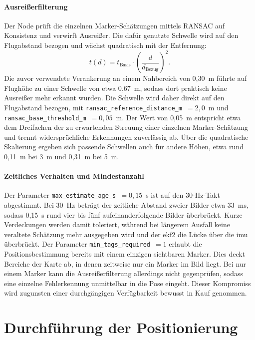 \paragraph{Ausreißerfilterung}
Der Node prüft die einzelnen Marker-Schätzungen mittels RANSAC auf Konsistenz und verwirft Ausreißer.
Die dafür genutzte Schwelle wird auf den Flugabstand bezogen und wächst quadratisch mit der Entfernung:
\begin{equation}
t(d) = t_\text{Basis}\cdot\left(\frac{d}{d_\text{Bezug}}\right)^{2}.
\label{eq:ransac_scaling}
\end{equation}
Die zuvor verwendete Verankerung an einem Nahbereich von 0{,}30~m führte auf Flughöhe zu einer Schwelle von etwa 0{,}67~m, sodass dort praktisch keine Ausreißer mehr erkannt wurden.
Die Schwelle wird daher direkt auf den Flugabstand bezogen, mit \texttt{ransac\_reference\_distance\_m}~$=2{,}0$~m und \texttt{ransac\_base\_threshold\_m}~$=0{,}05$~m.
Der Wert von 0{,}05~m entspricht etwa dem Dreifachen der zu erwartenden Streuung einer einzelnen Marker-Schätzung und trennt widersprüchliche Erkennungen zuverlässig ab.
Über die quadratische Skalierung ergeben sich passende Schwellen auch für andere Höhen, etwa rund 0{,}11~m bei 3~m und 0{,}31~m bei 5~m.

\paragraph{Zeitliches Verhalten und Mindestanzahl}
Der Parameter \texttt{max\_estimate\_age\_s}~$=0{,}15$~s ist auf den 30-Hz-Takt abgestimmt.
Bei 30~Hz beträgt der zeitliche Abstand zweier Bilder etwa 33~ms, sodass 0{,}15~s rund vier bis fünf aufeinanderfolgende Bilder überbrückt.
Kurze Verdeckungen werden damit toleriert, während bei längerem Ausfall keine veraltete Schätzung mehr ausgegeben wird und der \gls{ekf2} die Lücke über die \gls{imu} überbrückt.
Der Parameter \texttt{min\_tags\_required}~$=1$ erlaubt die Positionsbestimmung bereits mit einem einzigen sichtbaren Marker.
Dies deckt Bereiche der Karte ab, in denen zeitweise nur ein Marker im Bild liegt.
Bei nur einem Marker kann die Ausreißerfilterung allerdings nicht gegenprüfen, sodass eine einzelne Fehlerkennung unmittelbar in die Pose eingeht.
Dieser Kompromiss wird zugunsten einer durchgängigen Verfügbarkeit bewusst in Kauf genommen.



\section{Durchführung der Positionierung}

